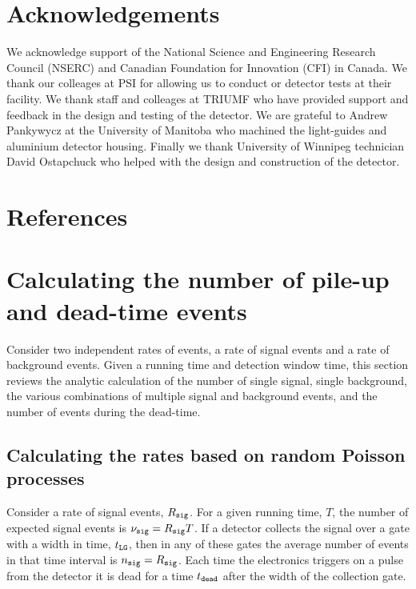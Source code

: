 \documentclass[letter,twocolumn,preprint,3p,numbers,sort&compress]{elsarticle}
\begin{document}
\section{Acknowledgements}

We acknowledge support of the National Science and Engineering
Research Council (NSERC) and Canadian Foundation for Innovation (CFI)
in Canada.  We thank our colleages at PSI for allowing us to conduct
or detector tests at their facility.  We thank staff and colleages at
TRIUMF who have provided support and feedback in the design and
testing of the detector.  We are grateful to Andrew Pankywycz at the
University of Manitoba who machined the light-guides and aluminium
detector housing.  Finally we thank University of Winnipeg technician
David Ostapchuck who helped with the design and construction of the
detector.

\section*{References}


%
%

\appendix

\section{Calculating the number of pile-up and dead-time events}\label{sec:stats}

Consider two independent rates of events, a rate of signal events and
a rate of background events.  Given a running time and detection
window time, this section reviews the analytic calculation of the
number of single signal, single background, the various combinations
of multiple signal and background events, and the number of events
during the dead-time.

\subsection{Calculating the rates based on random Poisson processes}

Consider a rate of signal events, $R_{\tt sig}$.  For a given running
time, $T$, the number of expected signal events is $\nu_{\tt sig} =
R_{\tt sig} T$.  If a detector collects the signal over a gate with a
width in time, $t_{\tt LG}$, then in any of these gates the average
number of events in that time interval is $n_{\tt sig} = R_{\tt sig}$.
Each time the electronics triggers on a pulse from the detector it is
dead for a time $t_{\tt dead}$ after the width of the collection gate.
\end{document}
